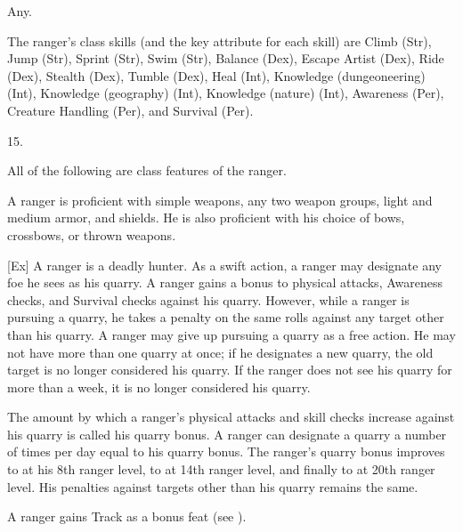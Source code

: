  Any.

The ranger's class skills (and the key attribute for each skill) are Climb (Str), Jump (Str), Sprint (Str), Swim (Str), Balance (Dex), Escape Artist (Dex), Ride (Dex), Stealth (Dex), Tumble (Dex), Heal (Int), Knowledge (dungeoneering) (Int), Knowledge (geography) (Int), Knowledge (nature) (Int), Awareness (Per), Creature Handling (Per), and Survival (Per).

15.


All of the following are class features of the ranger.

 A ranger is proficient with simple weapons, any two weapon groups, light and medium armor, and shields.
He is also proficient with his choice of bows, crossbows, or thrown weapons.

[Ex]
A ranger is a deadly hunter.
As a swift action, a ranger may designate any foe he sees as his quarry.
A ranger gains a  bonus to physical attacks, Awareness checks, and Survival checks against his quarry.
However, while a ranger is pursuing a quarry, he takes a  penalty on the same rolls against any target other than his quarry.
A ranger may give up pursuing a quarry as a free action.
He may not have more than one quarry at once; if he designates a new quarry, the old target is no longer considered his quarry.
If the ranger does not see his quarry for more than a week, it is no longer considered his quarry.

\par The amount by which a ranger's physical attacks and skill checks increase against his quarry is called his quarry bonus.
A ranger can designate a quarry a number of times per day equal to his quarry bonus.
The ranger's quarry bonus improves to  at his 8th ranger level, to  at 14th ranger level, and finally to  at 20th ranger level.
His penalties against targets other than his quarry remains the same.

A ranger gains Track as a bonus feat (see ).

